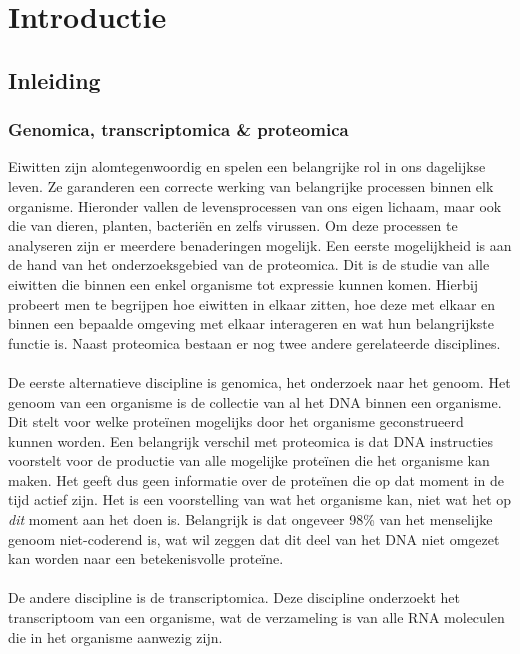 \chapter{Introductie}\label{ch:introductie}


\section{Inleiding}\label{sec:inleiding}

\subsection{Genomica, transcriptomica \& proteomica}\label{subsec:genomica-transcriptomica-&-proteomica}
Eiwitten zijn alomtegenwoordig en spelen een belangrijke rol in ons dagelijkse leven.
Ze garanderen een correcte werking van belangrijke processen binnen elk organisme.
Hieronder vallen de levensprocessen van ons eigen lichaam, maar ook die van dieren, planten, bacteriën en zelfs virussen.
Om deze processen te analyseren zijn er meerdere benaderingen mogelijk.
Een eerste mogelijkheid is aan de hand van het onderzoeksgebied van de proteomica.
Dit is de studie van alle eiwitten die binnen een enkel organisme tot expressie kunnen komen.
Hierbij probeert men te begrijpen hoe eiwitten in elkaar zitten, hoe deze met elkaar en binnen een bepaalde omgeving met elkaar interageren en wat hun belangrijkste functie is.
Naast proteomica bestaan er nog twee andere gerelateerde disciplines.
\\ \\
De eerste alternatieve discipline is genomica, het onderzoek naar het genoom.
Het genoom van een organisme is de collectie van al het DNA binnen een organisme.
Dit stelt voor welke proteïnen mogelijks door het organisme geconstrueerd kunnen worden.
Een belangrijk verschil met proteomica is dat DNA instructies voorstelt voor de productie van alle mogelijke proteïnen die het organisme kan maken.
Het geeft dus geen informatie over de proteïnen die op dat moment in de tijd actief zijn.
Het is een voorstelling van wat het organisme kan, niet wat het op \textit{dit} moment aan het doen is.
Belangrijk is dat ongeveer 98\% van het menselijke genoom niet-coderend is, wat wil zeggen dat dit deel van het DNA niet omgezet kan worden naar een betekenisvolle proteïne.
\\ \\
De andere discipline is de transcriptomica.
Deze discipline onderzoekt het transcriptoom van een organisme, wat de verzameling is van alle RNA moleculen die in het organisme aanwezig zijn.
